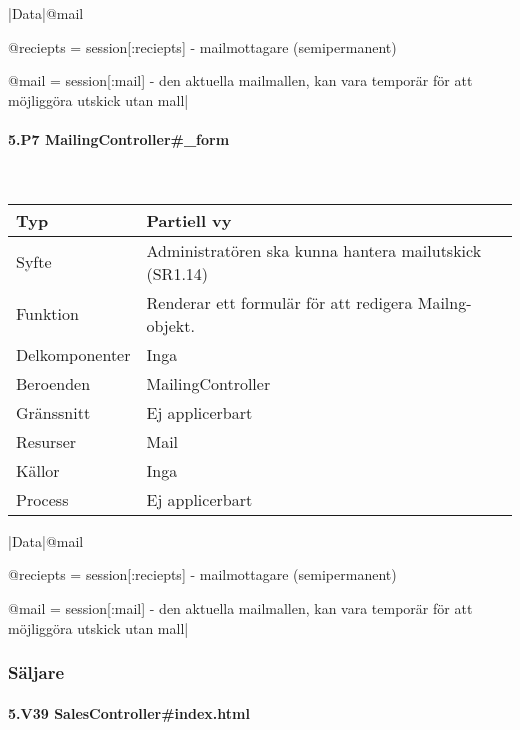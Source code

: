 \documentclass[a4paper, twoside, 11pt, titlepage]{article}
\begin{document}
			|Data|@mail

			@reciepts = session[:reciepts] - mailmottagare (semipermanent)

			@mail = session[:mail] - den aktuella mailmallen, kan vara temporär för att möjliggöra utskick utan mall|

			\paragraph{5.P7 MailingController\#\_form}\

			\begin {table} [ht] \begin{tabular} {  p{3.5cm} p{9.6cm} }
				\hline
				Typ & Partiell vy  \\
				\hline
				Syfte & Administratören ska kunna hantera mailutskick (SR1.14)  \\
				\hline
				Funktion & Renderar ett formulär för att redigera Mailng-objekt.  \\
				\hline
				Delkomponenter & Inga  \\
				\hline
				Beroenden & MailingController  \\
				\hline
				Gränssnitt & Ej applicerbart  \\
				\hline
				Resurser & Mail  \\
				\hline
				Källor & Inga  \\
				\hline
				Process & Ej applicerbart  \\
				\hline
			\end{tabular} \end{table} \FloatBarrier
			\vspace{6mm}

			|Data|@mail

			@reciepts = session[:reciepts] - mailmottagare (semipermanent)

			@mail = session[:mail] - den aktuella mailmallen, kan vara temporär för att möjliggöra utskick utan mall|

		\subsubsection{Säljare}



			\paragraph{5.V39 SalesController\#index.html}\
\end{document}
